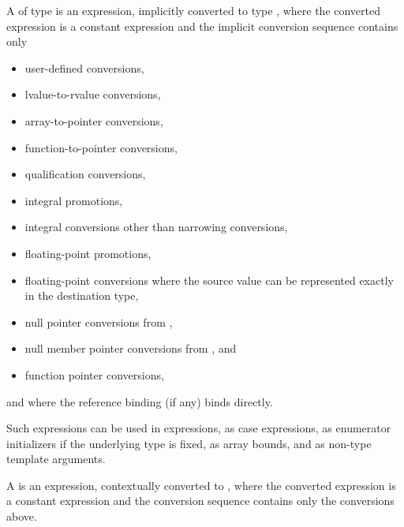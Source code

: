 \pnum
A 
of type  is an
expression, implicitly converted to type , where
the converted expression is a constant expression and the
implicit conversion sequence contains only
\begin{itemize}
\item user-defined conversions,
\item lvalue-to-rvalue conversions,
\item array-to-pointer conversions,
\item function-to-pointer conversions,
\item qualification conversions,
\item integral promotions,
\item integral conversions other than narrowing conversions,
\item floating-point promotions,
\item floating-point conversions where
  the source value can be represented exactly in the destination type,
\item null pointer conversions from ,
\item null member pointer conversions from , and
\item function pointer conversions,
\end{itemize}
and where the reference binding (if any) binds directly.
\begin{note}
Such expressions can be used in 
expressions, as case expressions,
as enumerator initializers if the underlying type is
fixed, as array bounds, and
as non-type template
arguments.
\end{note}
%
%
A  is
an expression, contextually converted to ,
where the converted expression is a constant expression and
the conversion sequence contains only the conversions above.

